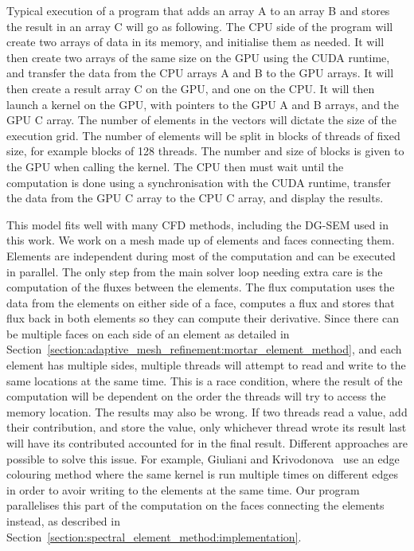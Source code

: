 Typical execution of a program that adds an array A to an array B and stores the result in an array
C will go as following. The CPU side of the program will create two arrays of data in its memory,
and initialise them as needed. It will then create two arrays of the same size on the GPU using the
CUDA runtime, and transfer the data from the CPU arrays A and B to the GPU arrays. It will then
create a result array C on the GPU, and one on the CPU. It will then launch a kernel on the GPU, 
with pointers to the GPU A and B arrays, and the GPU C array. The number of elements in the vectors
will dictate the size of the execution grid. The number of elements will be split in blocks of
threads of fixed size, for example blocks of 128 threads. The number and size of blocks is given to
the GPU when calling the kernel. The CPU then must wait until the computation is done using a
synchronisation with the CUDA runtime, transfer the data from the GPU C array to the CPU C array,
and display the results. 

This model fits well with many CFD methods, including the DG-SEM used in this work. We work on a
mesh made up of elements and faces connecting them. Elements are independent during most of the
computation and can be executed in parallel. The only step from the main solver loop needing extra
care is the computation of the fluxes between the elements. The flux computation uses the data from
the elements on either side of a face, computes a flux and stores that flux back in both elements so
they can compute their derivative. Since there can be multiple faces on each side of an element as
detailed in Section~\ref{section:adaptive_mesh_refinement:mortar_element_method}, and each element
has multiple sides, multiple threads will attempt to read and write to the same locations at the
same time. This is a race condition, where the result of the computation will be dependent on the
order the threads will try to access the memory location. The results may also be wrong. If
two threads read a value, add their contribution, and store the value, only whichever thread wrote
its result last will have its contributed accounted for in the final result. Different approaches
are possible to solve this issue. For example, Giuliani and Krivodonova~\cite{Giuliani2019} use an
edge colouring method where the same kernel is run multiple times on different edges in order to
avoir writing to the elements at the same time. Our program parallelises this part of the
computation on the faces connecting the elements instead, as described in
Section~\ref{section:spectral_element_method:implementation}. 

